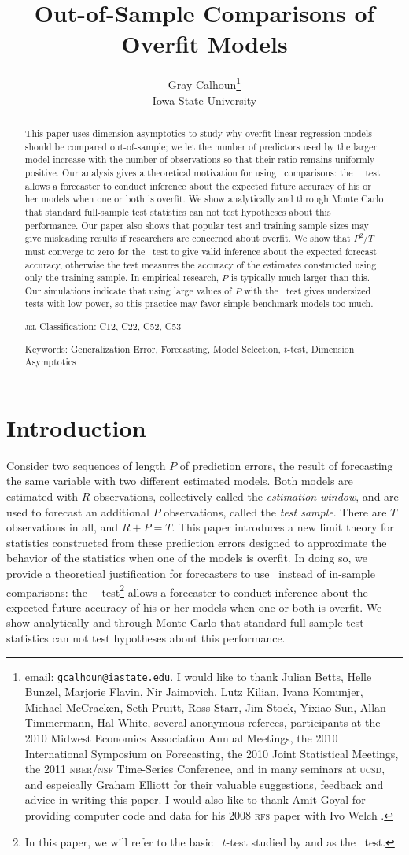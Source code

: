 \documentclass[11pt]{article}
\title{Out-of-Sample Comparisons of Overfit Models}
\author{Gray Calhoun\thanks{email: \texttt{gcalhoun@iastate.edu}. I
    would like to thank Julian Betts, Helle Bunzel, Marjorie Flavin,
    Nir Jaimovich, Lutz Kilian, Ivana Komunjer, Michael McCracken,
    Seth Pruitt, Ross Starr, Jim Stock, Yixiao Sun, Allan Timmermann,
    Hal White, several anonymous referees, participants at the 2010
    Midwest Economics Association Annual Meetings, the 2010
    International Symposium on Forecasting, the 2010 Joint Statistical
    Meetings, the 2011 \textsc{nber}/\textsc{nsf} Time-Series
    Conference, and in many seminars at \textsc{ucsd}, and espeically
    Graham Elliott for their valuable suggestions, feedback and advice
    in writing this paper.  I would also like to thank Amit Goyal for
    providing computer code and data for his 2008 \textsc{rfs} paper
    with Ivo Welch \citep{GoW:08}.} \\ Iowa State University}
\begin{document}
\maketitle

\begin{abstract}\thispagestyle{empty}\noindent
  This paper uses dimension asymptotics to study why overfit linear
  regression models should be compared out-of-sample; we let the
  number of predictors used by the larger model increase with the
  number of observations so that their ratio remains uniformly
  positive.  Our analysis gives a theoretical motivation for using
  \oos\ comparisons: the \dmw\ \oos\ test allows a forecaster to
  conduct inference about the expected future accuracy of his or her
  models when one or both is overfit.  We show analytically and
  through Monte Carlo that standard full-sample test statistics can
  not test hypotheses about this performance.  Our paper also shows
  that popular test and training sample sizes may give misleading
  results if researchers are concerned about overfit.  We show that
  $P^2/T$ must converge to zero for the \dmw\ test to give valid
  inference about the expected forecast accuracy, otherwise the test
  measures the accuracy of the estimates constructed using only the
  training sample.  In empirical research, $P$ is typically much
  larger than this.  Our simulations indicate that using large values
  of $P$ with the \dmw\ test gives undersized tests with low power, so
  this practice may favor simple benchmark models too much.

\noindent \textsc{jel} Classification: C12, C22, C52, C53

\noindent Keywords: Generalization Error, Forecasting, Model
Selection, $t$-test, Dimension Asymptotics
\end{abstract}
\newpage

\section{Introduction}\label{sec:introduction}
Consider two sequences of length $P$ of prediction errors, the result
of forecasting the same variable with two different estimated models.
Both models are estimated with $R$ observations, collectively called
the {\em estimation window}, and are used to forecast an additional
$P$ observations, called the {\em test sample}.  There are $T$
observations in all, and $R+P=T$.  This paper introduces a new limit
theory for statistics constructed from these prediction errors
designed to approximate the behavior of the statistics when one of the
models is overfit.  In doing so, we provide a theoretical
justification for forecasters to use \oos\ instead of in-sample
comparisons: the \dmw\ \oos\ test\footnote{In this paper, we will
  refer to the basic \oos\ $t$-test studied by \citet{DiM:95} and
  \citet{Wes:96} as the \dmw\ test.} allows a forecaster to conduct
inference about the expected future accuracy of his or her models when
one or both is overfit.  We show analytically and through Monte Carlo
that standard full-sample test statistics can not test hypotheses
about this performance.
\end{document}
